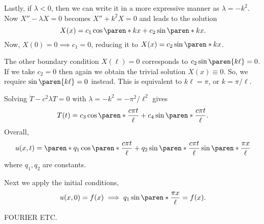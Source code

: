 \documentclass[11pt]{penrose}
\begin{document}
Lastly, if $\lambda < 0$, then we can write it in a more expressive manner as $\lambda = - k^2$. Now $X'' - \lambda X = 0$ becomes $X'' + k^2 X = 0$ and leads to the solution
\begin{equation}
    X(x) = c_1 \cos\paren*{kx} + c_2 \sin\paren*{kx}.
\end{equation}
Now, $X(0) = 0 \implies c_1 = 0$, reducing it to $X(x) = c_2 \sin\paren*{kx}$.

The other boundary condition $X(\ell) = 0$ corresponds to $c_2 \sin\paren{k\ell} = 0$. If we take $c_2 = 0$ then again we obtain the trivial solution $X(x) \equiv 0$. So, we require $\sin\paren{k\ell} = 0$ instead. This is equivalent to $k\ell = \pi$, or $k = \pi / \ell$.

Solving $\ddot{T} - c^2 \lambda T = 0$ with $\lambda = -k^2 = -\pi^2 / \ell^2$ gives
\begin{equation}
    T(t) = c_3 \cos\paren*{\frac{c \pi t}{\ell}} + c_4 \sin\paren*{\frac{c \pi t}{\ell}}.
\end{equation}
Overall,
\begin{equation}
    u(x,t) = \paren*{q_1 \cos\paren*{\frac{c \pi t}{\ell}} + q_2 \sin\paren*{\frac{c \pi t}{\ell}}} \sin\paren*{\frac{\pi x}{\ell}}
\end{equation}
where $q_1, q_2$ are constants.

Next we apply the initial conditions,
\begin{equation}
    u(x,0) = f(x)
    \implies
    q_1 \sin\paren*{\frac{\pi x}{\ell}} = f(x).
\end{equation}

FOURIER ETC.
\end{document}
